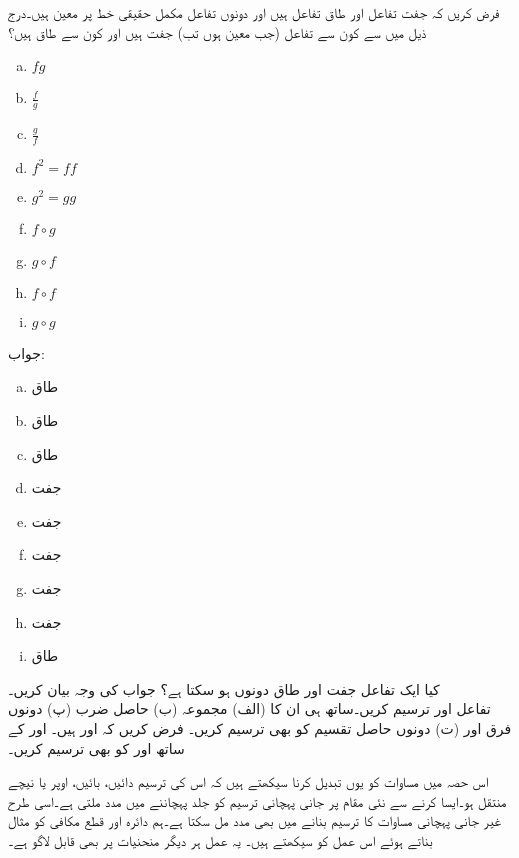 فرض کریں کہ  جفت تفاعل اور  طاق تفاعل ہیں اور دونوں تفاعل مکمل حقیقی خط  پر معین ہیں۔درج ذیل میں سے کون سے تفاعل (جب معین ہوں تب) جفت ہیں اور کون سے طاق ہیں؟
\begin{multicols}{3}
\begin{enumerate}[a.]
\item
$fg$
\item
$\frac{f}{g}$
\item
$\frac{g}{f}$
\item
$f^2=ff$
\item
$g^2=gg$
\item
$f\circ g$
\item
$g\circ f$
\item
$f\circ f$
\item
$g \circ g$
\end{enumerate}
\end{multicols}
جواب:
\begin{multicols}{3}
\begin{enumerate}[a.]
\item
طاق
\item
طاق
\item
طاق
\item
جفت
\item
جفت
\item
جفت
\item
جفت
\item
جفت
\item
طاق
\end{enumerate}
\end{multicols}
کیا ایک تفاعل جفت اور طاق دونوں ہو سکتا ہے؟ جواب کی وجہ بیان کریں۔
\\

تفاعل  اور  ترسیم کریں۔ساتھ ہی ان کا (الف) مجموعہ (ب) حاصل ضرب (پ) دونوں فرق اور (ت) دونوں حاصل تقسیم کو بھی ترسیم کریں۔
فرض کریں کہ  اور  ہیں۔ اور  کے ساتھ  اور  کو بھی ترسیم کریں۔

اس حصہ میں مساوات کو یوں تبدیل کرنا سیکھتے ہیں کہ اس کی ترسیم دائیں، بائیں، اوپر یا نیچے منتقل ہو۔ایسا کرنے سے  نئی مقام پر جانی پہچانی ترسیم کو جلد پہچاننے میں مدد ملتی ہے۔اسی طرح غیر جانی پہچانی مساوات کا ترسیم بنانے میں بھی مدد مل سکتا ہے۔ہم دائرہ اور قطع مکافی کو مثال بناتے ہوئے اس عمل کو سیکھتے ہیں۔ یہ عمل ہر دیگر منحنیات پر بھی قابل لاگو ہے۔

